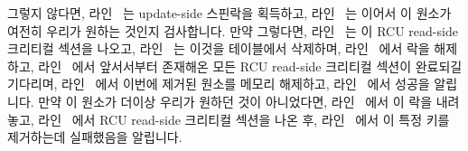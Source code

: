 \begin{fcvref}
그렇지 않다면, 라인~ 는 update-side 스핀락을 획득하고,
라인~ 는 이어서 이 원소가 여전히 우리가 원하는 것인지
검사합니다.
만약 그렇다면, 라인~ 는 이 RCU read-side 크리티컬 섹션을
나오고, 라인~ 는 이것을 테이블에서 삭제하며, 라인~
에서 락을 해제하고, 라인~ 에서 앞서서부터 존재해온 모든 RCU
read-side 크리티컬 섹션이 완료되길 기다리며, 라인~ 에서 이번에
제거된 원소를 메모리 해제하고, 라인~ 에서 성공을 알립니다.
만약 이 원소가 더이상 우리가 원하던 것이 아니었다면, 라인~ 에서 이
락을 내려놓고, 라인~ 에서 RCU read-side 크리티컬 섹션을 나온
후, 라인~ 에서 이 특정 키를 제거하는데 실패했음을 알립니다.
\end{fcvref}

